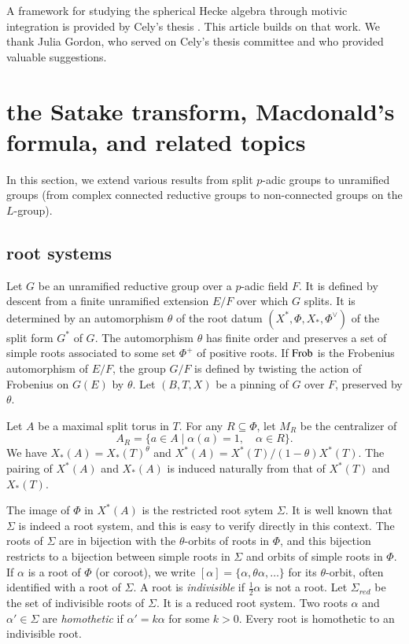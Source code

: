 A framework for studying the spherical Hecke algebra through motivic
integration is provided by Cely's thesis \cite{cely}.  This article
builds on that work.  We thank Julia Gordon, who served on Cely's
thesis committee and who provided valuable suggestions.



\section{the Satake transform, Macdonald's formula, and related topics}
\label{XX} %

In this section, we extend various results from split $p$-adic groups
to unramified groups (from complex connected reductive groups to
non-connected groups on the $L$-group).

\subsection{root systems}

Let $G$ be an unramified reductive group over a $p$-adic field $F$.
It is defined by descent from a finite unramified extension $E/F$ over
which $G$ splits.  It is determined by an automorphism $\theta$ of the
root datum $(X^*,\Phi,X_*,\Phi^\vee)$ of the split form $G^*$ of $G$.
The automorphism $\theta$ has finite order and preserves a set of
simple roots associated to some set $\Phi^+$ of positive roots.  If
${\operatorname{Frob}}$ is the Frobenius automorphism of $E/F$, the group $G/F$ is
defined by twisting the action of Frobenius on $G(E)$ by $\theta$.  Let
$(B,T,X)$ be a pinning of $G$ over $F$, preserved by $\theta$.

Let $A$ be a maximal split torus in $T$.  For any $R\subseteq \Phi$,
let $M_R$ be the centralizer of
\[
A_R = \{a\in A\mid \alpha(a)=1,\quad \alpha\in R\}.
\]
We have $X_*(A) = X_*(T)^\theta$ and $X^*(A) =
X^*(T)/(1-\theta)X^*(T)$.  The pairing of $X^*(A)$ and $X_*(A)$ is
induced naturally from that of $X^*(T)$ and $X_*(T)$.

The image of $\Phi$ in $X^*(A)$ is the restricted root sytem $\Sigma$.
It is well known that $\Sigma$ is indeed a root system, and this is
easy to verify directly in this context.  The roots of $\Sigma$ are in
bijection with the $\theta$-orbits of roots in $\Phi$, and this
bijection restricts to a bijection between simple roots in $\Sigma$
and orbits of simple roots in $\Phi$.  If $\alpha$ is a root of $\Phi$
(or coroot), we write $[\alpha]=\{\alpha,\theta\alpha,\ldots\}$ for
its $\theta$-orbit, often identified with a root of $\Sigma$.
A root is {\it indivisible} if $\frac12\alpha$ is not a root.
Let $\Sigma_{red}$ be the set of %
indivisible roots of $\Sigma$.  It is a reduced root system.
Two roots $\alpha$ and $\alpha'\in\Sigma$ are {\it homothetic} if
$\alpha' = k\alpha$ for some $k>0$.  Every root is homothetic to an
indivisible root.  %

